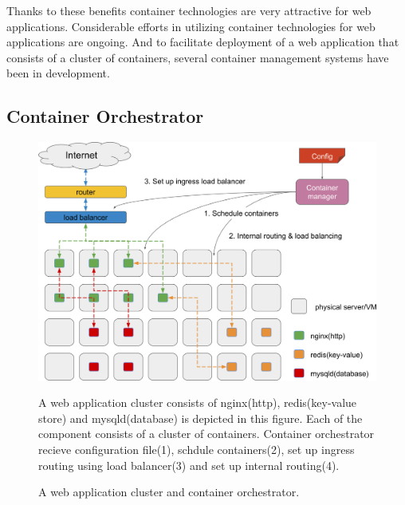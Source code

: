 Thanks to these benefits container technologies are very attractive for web applications.
Considerable efforts in utilizing container technologies for web applications are ongoing.
And to facilitate deployment of a web application that consists of a cluster of containers, several container management systems have been in development.

\subsection{Container Orchestrator}

\begin{figure}[h]
\begin{center}
\includegraphics[width=0.9\columnwidth]{Figs/container_management_system}
\end{center}
\caption{
A web application cluster and container orchestrator.
}

A web application cluster consists of nginx(http), redis(key-value store) and mysqld(database) is depicted in this figure. 
Each of the component consists of a cluster of containers.
Container orchestrator recieve configuration file(1), schdule containers(2), set up ingress routing using load balancer(3) and set up internal routing(4).

\label{fig:container_management_system}
\end{figure}

